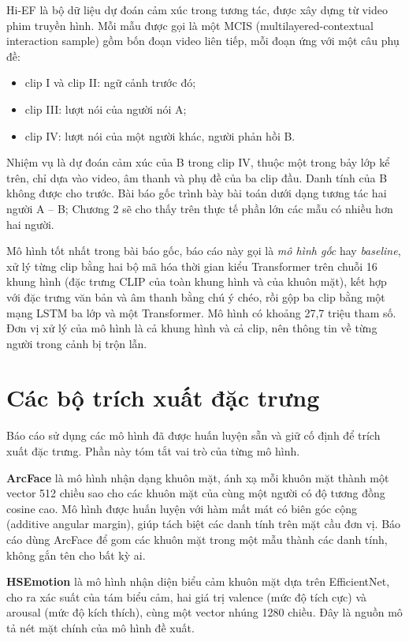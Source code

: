 Hi-EF \cite{wang2026hief} là bộ dữ liệu dự đoán cảm xúc trong tương tác, được xây dựng từ video phim truyền hình. Mỗi mẫu được gọi là một MCIS (multilayered-contextual interaction sample) gồm bốn đoạn video liên tiếp, mỗi đoạn ứng với một câu phụ đề:

\begin{itemize}
	\item clip I và clip II: ngữ cảnh trước đó;
	\item clip III: lượt nói của người nói A;
	\item clip IV: lượt nói của một người khác, người phản hồi B.
\end{itemize}

Nhiệm vụ là dự đoán cảm xúc của B trong clip IV, thuộc một trong bảy lớp kể trên, chỉ dựa vào video, âm thanh và phụ đề của ba clip đầu. Danh tính của B không được cho trước. Bài báo gốc trình bày bài toán dưới dạng tương tác hai người A -- B; Chương 2 sẽ cho thấy trên thực tế phần lớn các mẫu có nhiều hơn hai người.

Mô hình tốt nhất trong bài báo gốc, báo cáo này gọi là \emph{mô hình gốc} hay \emph{baseline}, xử lý từng clip bằng hai bộ mã hóa thời gian kiểu Transformer trên chuỗi 16 khung hình (đặc trưng CLIP của toàn khung hình và của khuôn mặt), kết hợp với đặc trưng văn bản và âm thanh bằng chú ý chéo, rồi gộp ba clip bằng một mạng LSTM ba lớp và một Transformer. Mô hình có khoảng 27,7 triệu tham số. Đơn vị xử lý của mô hình là cả khung hình và cả clip, nên thông tin về từng người trong cảnh bị trộn lẫn.

\section{Các bộ trích xuất đặc trưng}

Báo cáo sử dụng các mô hình đã được huấn luyện sẵn và giữ cố định để trích xuất đặc trưng. Phần này tóm tắt vai trò của từng mô hình.

\textbf{ArcFace} \cite{deng2019arcface} là mô hình nhận dạng khuôn mặt, ánh xạ mỗi khuôn mặt thành một vector 512 chiều sao cho các khuôn mặt của cùng một người có độ tương đồng cosine cao. Mô hình được huấn luyện với hàm mất mát có biên góc cộng (additive angular margin), giúp tách biệt các danh tính trên mặt cầu đơn vị. Báo cáo dùng ArcFace để gom các khuôn mặt trong một mẫu thành các danh tính, không gắn tên cho bất kỳ ai.

\textbf{HSEmotion} \cite{savchenko2022hsemotion} là mô hình nhận diện biểu cảm khuôn mặt dựa trên EfficientNet, cho ra xác suất của tám biểu cảm, hai giá trị valence (mức độ tích cực) và arousal (mức độ kích thích), cùng một vector nhúng 1280 chiều. Đây là nguồn mô tả nét mặt chính của mô hình đề xuất.

